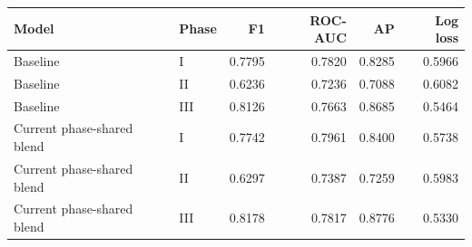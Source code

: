 \begin{tabular}{llrrrr}
\toprule
Model & Phase & F1 & ROC-AUC & AP & Log loss \\
\midrule
Baseline & I & 0.7795 & 0.7820 & 0.8285 & 0.5966 \\
Baseline & II & 0.6236 & 0.7236 & 0.7088 & 0.6082 \\
Baseline & III & 0.8126 & 0.7663 & 0.8685 & 0.5464 \\
Current phase-shared blend & I & 0.7742 & 0.7961 & 0.8400 & 0.5738 \\
Current phase-shared blend & II & 0.6297 & 0.7387 & 0.7259 & 0.5983 \\
Current phase-shared blend & III & 0.8178 & 0.7817 & 0.8776 & 0.5330 \\
\bottomrule
\end{tabular}

